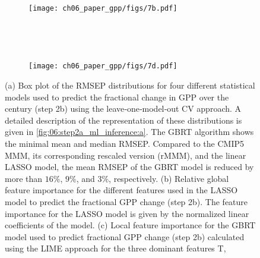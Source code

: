 \begin{figure}[p]
  \centering
  \begin{subfigure}[b]{\SubfigureWidth{}}
    \caption{}
    \label{fig:06:step2b_ml_inference:a}
  \end{subfigure}
  ~
  \begin{subfigure}[b]{\SubfigureWidth{}}
    \texttt{[image: ch06\_paper\_gpp/figs/7b.pdf]}
    \caption{}
    \label{fig:06:step2b_ml_inference:b}
  \end{subfigure}
  \\
  \begin{subfigure}[b]{\SubfigureWidth{}}
    \caption{}
    \label{fig:06:step2b_ml_inference:c}
  \end{subfigure}
  ~
  \begin{subfigure}[b]{\SubfigureWidth{}}
    \texttt{[image: ch06\_paper\_gpp/figs/7d.pdf]}
    \caption{}
    \label{fig:06:step2b_ml_inference:d}
  \end{subfigure}
  \caption[
    Prediction error in a leave-one-model-out \acl{CV} setup and feature
    importance of our \acl{ML} approach to constrain the fractional change in
    \acf{GPP} over the  century in step 2b.
  ]{
    (a) Box plot of the \acf{RMSEP} distributions for four different
    statistical models used to predict the fractional change in \acf{GPP} over
    the  century (step 2b) using the leave‐one‐model‐out \acl{CV}
    approach. A detailed description of the representation of these
    distributions is given in \cref{fig:06:step2a_ml_inference:a}. The
    \acf{GBRT} algorithm shows the minimal mean and median \acs{RMSEP}.
    Compared to the \acs{CMIP}5 \acf{MMM}, its corresponding rescaled version
    (r\acs{MMM}), and the linear \acf{LASSO} model, the mean \acs{RMSEP} of the
    \acs{GBRT} model is reduced by more than $16 \unit{\%}$, $9 \unit{\%}$, and
    $3 \unit{\%}$, respectively. (b) Relative global feature importance for the
    different features used in the \acs{LASSO} model to predict the fractional
    \acs{GPP} change (step 2b). The feature importance for the \acs{LASSO}
    model is given by the normalized linear coefficients of the model. (c)
    Local feature importance for the \acs{GBRT} model used to predict
    fractional \acs{GPP} change (step 2b) calculated using the \acf{LIME}
    approach \autocite{Ribeiro2016} for the three dominant features \acf{T},
}
\end{figure}
